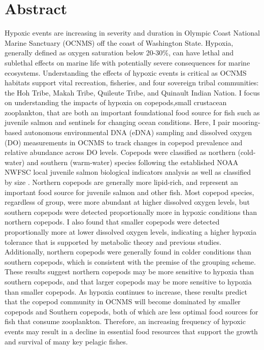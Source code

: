\documentclass[12pt,twoside]{reedthesis}
\begin{document}
    \chapter*{Abstract}
Hypoxic events are increasing in severity and duration in Olympic Coast National Marine Sanctuary (OCNMS) off the coast of Washington State. Hypoxia, generally defined as oxygen saturation below 20-30\%, can have lethal and sublethal effects on marine life with potentially severe consequences for marine ecosystems. Understanding the effects of hypoxic events is critical as OCNMS habitats support vital recreation, fisheries, and four sovereign tribal communities: the Hoh Tribe, Makah Tribe, Quileute Tribe, and Quinault Indian Nation. I focus on understanding the impacts of hypoxia on copepods,small crustacean zooplankton, that are both an important foundational food source for fish such as juvenile salmon and sentinels for changing ocean conditions. Here, I pair mooring-based autonomous environmental DNA (eDNA) sampling and dissolved oxygen (DO) measurements in OCNMS to track changes in copepod prevalence and relative abundance across DO levels. Copepods were classified as northern (cold-water) and southern (warm-water) species following the established NOAA NWFSC local juvenile salmon biological indicators analysis as well as classified by size \autocite{NOAAFisheries2024}. Northern copepods are generally more lipid-rich, and represent an important food source for juvenile salmon and other fish. Most copepod species, regardless of group, were more abundant at higher dissolved oxygen levels, but southern copepods were detected proportionally more in hypoxic conditions than northern copepods. I also found that smaller copepods were detected proportionally more at lower dissolved oxygen levels, indicating a higher hypoxia tolerance that is supported by metabolic theory and previous studies. Additionally, northern copepods were generally found in colder conditions than southern copepods, which is consistent with the premise of the grouping scheme. These results suggest northern copepods may be more sensitive to hypoxia than southern copepods, and that larger copepods may be more sensitive to hypoxia than smaller copepods. As hypoxia continues to increase, these results predict that the copepod community in OCNMS will become dominated by smaller copepods and Southern copepods, both of which are less optimal food sources for fish that consume zooplankton. Therefore, an increasing frequency of hypoxic events may result in a decline in essential food resources that support the growth and survival of many key pelagic fishes.
	
\end{document}
